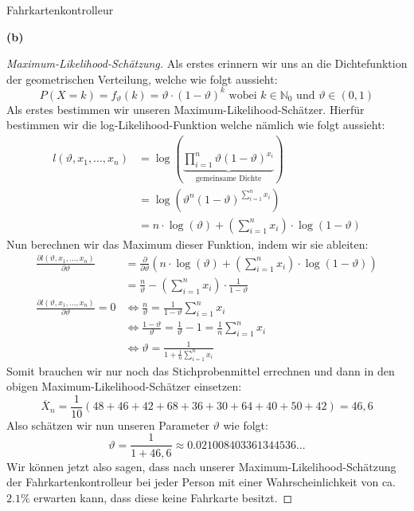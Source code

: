 \documentclass[a4paper]{article}
\newenvironment{Aufgabe}[2][Aufgabe]{\begin{trivlist}
\item[\hskip \labelsep {\bfseries #1}\hskip \labelsep {\bfseries #2.}]}{\end{trivlist}}
\begin{document}
	\begin{theorem} %
	\begin{Aufgabe}{1} %
		Fahrkartenkontrolleur
	\end{Aufgabe}

	\textbf{(b)} 

	\begin{proof}[Maximum-Likelihood-Schätzung]
		Als erstes erinnern wir uns an die Dichtefunktion der geometrischen
		Verteilung, welche wie folgt aussieht:
		\[
			P(X= k) = f_\vartheta (k) = \vartheta \cdot (1- \vartheta) ^{k}
			\text{ wobei } k \in \mathbb{N}_0
			\text{ und } \vartheta \in (0, 1)
		\]
		Als erstes bestimmen wir unseren Maximum-Likelihood-Schätzer.
		Hierfür bestimmen wir die log-Likelihood-Funktion welche nämlich
		wie folgt aussieht:
		\begin{align*}
			l (\vartheta, x_1, ..., x_{n}) &= \log \left(
				\underbrace{ \prod_{i=1}^{n} \vartheta (1-\vartheta) ^{x_{i}}  }_{ \text{ gemeinsame Dichte } } 
			\right) \\
			   &= \log \left(
				   \vartheta ^{n} (1 - \vartheta) ^{
						   \sum_{i=1}^{n} x_{i}
				   }
			   \right) \\
			   &= n \cdot \log (\vartheta) + 
			   \left(
				   \sum_{i=1}^{n} x_{i} 
			   \right) \cdot \log (1 - \vartheta)
		\end{align*}
		Nun berechnen wir das Maximum dieser Funktion, indem wir sie ableiten:
		\begin{align*}
			\frac{ \partial l(\vartheta, x_1, ..., x_{n}) }{ \partial \vartheta } &= 
			\frac{ \partial  }{ \partial \vartheta } \left(
			   n \cdot \log (\vartheta) + 
			   \left(
				   \sum_{i=1}^{n} x_{i} 
			   \right) \cdot \log (1 - \vartheta)
			\right) \\
			  &= \frac{ n }{ \vartheta } - \left(
			  	\sum_{i=1}^{n} x_{i}
			  \right) \cdot \frac{ 1 }{ 1 - \vartheta } \\
			\frac{ \partial l(\vartheta, x_1, ..., x_{n}) }{ \partial \vartheta } = 0
			  & \Leftrightarrow 
			  \frac{ n }{ \vartheta } = \frac{ 1 }{ 1- \vartheta } \sum_{i=1}^{n} x_{i} \\
			  & \Leftrightarrow \frac{ 1 - \vartheta }{ \vartheta }
			  = \frac{ 1 }{ \vartheta  } - 1
			  = \frac{ 1 }{ n } \sum_{i=1}^{n} x_{i} \\
			  & \Leftrightarrow \vartheta = \frac{ 1 }{ 1 + \frac{ 1 }{ n } \sum_{i=1}^{n} x_{i} }
		\end{align*}
		Somit brauchen wir nur noch das Stichprobenmittel errechnen und dann in den obigen
		Maximum-Likelihood-Schätzer einsetzen:
		\[
		\overline{X}_n = \frac{ 1 }{ 10 } \left(
			48 + 46 + 42 + 68 + 36 + 30 + 64 + 40 + 50 + 42
		\right) = 46,6
		\] 
		Also schätzen wir nun unseren Parameter $\vartheta$ wie folgt:
		\[
			\vartheta = \frac{ 1 }{ 1 + 46,6 }
			\approx 0.021008403361344536...
		\] 
		Wir können jetzt also sagen, dass nach unserer Maximum-Likelihood-Schätzung der
		Fahrkartenkontrolleur bei jeder Person mit einer Wahrscheinlichkeit von ca. $2.1\%$
		erwarten kann, dass diese keine Fahrkarte besitzt.
	\end{proof}
	\end{theorem}
\end{document}

